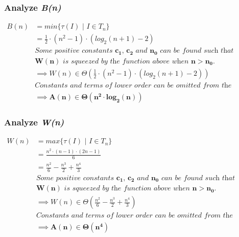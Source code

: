 \documentclass[10pt]{article}
\begin{document}
\subsubsection{Analyze \textit{B(n)}}
\begin{align*}
B(n) &= min\{\tau(I)\text{ | }I \in T_{n}\} \\
&= \frac{1}{2} \cdot (n^2 - 1) \cdot (log_{2}(n + 1) - 2) \\
&\textit{Some positive constants $\mathbf{c_{1}}$, $\mathbf{c_{2}}$ and $\mathbf{n_{0}}$ can be found such that} \\ 
&\textit{$\mathbf{W(n)}$ is squeezed by the function above when $\mathbf{n > n_{0}}$.} \\
&\implies W(n) \in \Theta (\frac{1}{2} \cdot (n^2 - 1) \cdot (log_{2}(n + 1) - 2)) \\
&\textit{Constants and terms of lower order can be omitted from the complexity class.} \\
&\implies \mathbf{A(n) \boldsymbol{\in} \Theta(n^{2} \cdot log_{2}(n))}
\end{align*}

\subsubsection{Analyze \textit{W(n)}}
\label{sec:thirdif}
\begin{align*}
W(n) &= max\{\tau(I)\text{ | }I \in T_{n}\} \\
&= \frac{ n^2\cdot (n-1) \cdot (2n-1) } {6} \\
&= \frac{n^2}{6} - \frac{n^3}{2} + \frac{n^4}{3} \\
&\textit{Some positive constants $\mathbf{c_{1}}$, $\mathbf{c_{2}}$ and $\mathbf{n_{0}}$ can be found such that} \\ 
&\textit{$\mathbf{W(n)}$ is squeezed by the function above when $\mathbf{n > n_{0}}$.} \\
&\implies W(n) \in \Theta (\frac{n^2}{6} - \frac{n^3}{2} + \frac{n^4}{3}) \\
&\textit{Constants and terms of lower order can be omitted from the complexity class.} \\
&\implies \mathbf{A(n) \boldsymbol{\in} \Theta(n^{4})}
\end{align*}
\end{document}
